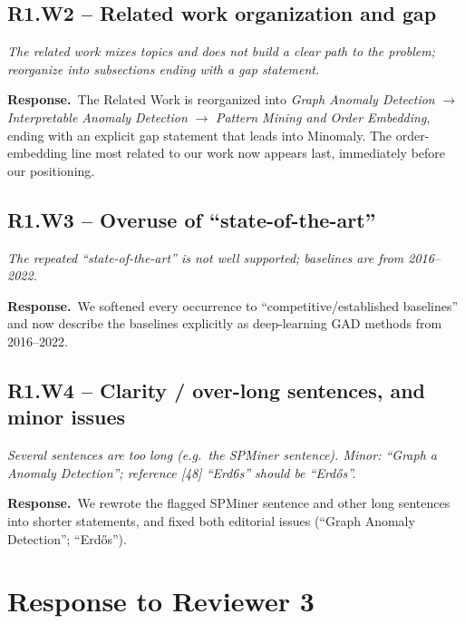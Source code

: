 \documentclass[11pt]{article}
\newcommand{\comment}[1]{\begin{reviewerbox}\itshape #1\end{reviewerbox}}
\newcommand{\response}{\par\noindent\textbf{\textcolor{respgreen}{Response.}}\ }
\begin{document}
\subsection*{R1.W2 -- Related work organization and gap}
\comment{The related work mixes topics and does not build a clear path to the problem; reorganize into subsections ending with a gap statement.}
\response The Related Work is reorganized into \emph{Graph Anomaly Detection} $\rightarrow$ \emph{Interpretable Anomaly Detection} $\rightarrow$ \emph{Pattern Mining and Order Embedding}, ending with an explicit gap statement that leads into Minomaly. The order-embedding line most related to our work now appears last, immediately before our positioning.

\subsection*{R1.W3 -- Overuse of ``state-of-the-art''}
\comment{The repeated ``state-of-the-art'' is not well supported; baselines are from 2016--2022.}
\response We softened every occurrence to ``competitive/established baselines'' and now describe the baselines explicitly as deep-learning GAD methods from 2016--2022.

\subsection*{R1.W4 -- Clarity / over-long sentences, and minor issues}
\comment{Several sentences are too long (e.g.\ the SPMiner sentence). Minor: ``Graph a Anomaly Detection''; reference [48] ``Erd6s'' should be ``Erd\H{o}s''.}
\response We rewrote the flagged SPMiner sentence and other long sentences into shorter statements, and fixed both editorial issues (``Graph Anomaly Detection''; ``Erd\H{o}s'').

\section{Response to Reviewer 3}
\end{document}
